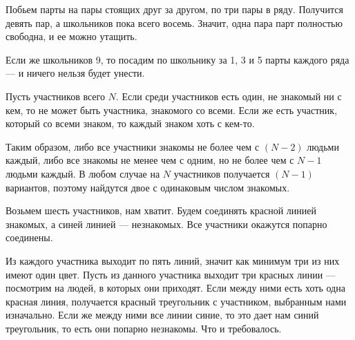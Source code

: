﻿
\begin{itemize}

\itA Побьем парты на пары стоящих друг за другом, по три пары в ряду. Получится девять пар, а школьников пока всего восемь. Значит, одна пара парт полностью свободна, и ее можно утащить.

Если же школьников 9, то посадим по школьнику за 1, 3 и 5 парты каждого ряда — и ничего нельзя будет унести.

\itB Пусть участников всего $N$. Если среди участников есть один, не знакомый ни с кем, то не может быть участника, знакомого со всеми. Если же есть участник, который со всеми знаком, то каждый знаком хоть с кем-то.

Таким образом, либо все участники знакомы не более чем с $(N-2)$ людьми каждый, либо все знакомы не менее чем с одним, но не более чем с $N-1$ людьми каждый. В любом случае на $N$ участников получается $(N-1)$ вариантов, поэтому найдутся двое с одинаковым числом знакомых.

\itC Возьмем шесть участников, нам хватит. Будем соединять красной линией знакомых, а синей линией — незнакомых. Все участники окажутся попарно соединены.

Из каждого участника выходит по пять линий, значит как минимум три из них имеют один цвет. Пусть из данного участника выходит три красных линии — посмотрим на людей, в которых они приходят. Если между ними есть хоть одна красная линия, получается красный треугольник с участником, выбранным нами изначально. Если же между ними все линии синие, то это дает нам синий треугольник, то есть они попарно незнакомы. Что и требовалось.

\end{itemize}
